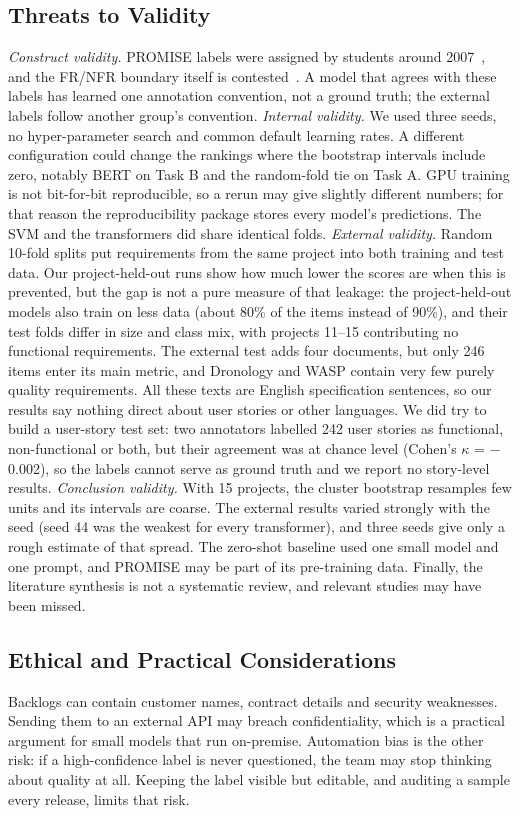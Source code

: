 \documentclass[conference,10pt,letterpaper]{IEEEtran}
\begin{document}
\subsection{Threats to Validity}\label{sec:threats}
\emph{Construct validity.} PROMISE labels were assigned by students around 2007~\cite{clelandhuang2007}, and the FR/NFR boundary itself is contested~\cite{dalpiaz2019}. A model that agrees with these labels has learned one annotation convention, not a ground truth; the external labels follow another group's convention. \emph{Internal validity.} We used three seeds, no hyper-parameter search and common default learning rates. A different configuration could change the rankings where the bootstrap intervals include zero, notably BERT on Task B and the random-fold tie on Task A. GPU training is not bit-for-bit reproducible, so a rerun may give slightly different numbers; for that reason the reproducibility package stores every model's predictions. The SVM and the transformers did share identical folds. \emph{External validity.} Random 10-fold splits put requirements from the same project into both training and test data. Our project-held-out runs show how much lower the scores are when this is prevented, but the gap is not a pure measure of that leakage: the project-held-out models also train on less data (about 80\% of the items instead of 90\%), and their test folds differ in size and class mix, with projects 11–15 contributing no functional requirements. The external test adds four documents, but only 246 items enter its main metric, and Dronology and WASP contain very few purely quality requirements. All these texts are English specification sentences, so our results say nothing direct about user stories or other languages. We did try to build a user-story test set: two annotators labelled 242 user stories as functional, non-functional or both, but their agreement was at chance level (Cohen's $\kappa$ = $-$0.002), so the labels cannot serve as ground truth and we report no story-level results. \emph{Conclusion validity.} With 15 projects, the cluster bootstrap resamples few units and its intervals are coarse. The external results varied strongly with the seed (seed 44 was the weakest for every transformer), and three seeds give only a rough estimate of that spread. The zero-shot baseline used one small model and one prompt, and PROMISE may be part of its pre-training data. Finally, the literature synthesis is not a systematic review, and relevant studies may have been missed.

\subsection{Ethical and Practical Considerations}
Backlogs can contain customer names, contract details and security weaknesses. Sending them to an external API may breach confidentiality, which is a practical argument for small models that run on-premise. Automation bias is the other risk: if a high-confidence label is never questioned, the team may stop thinking about quality at all. Keeping the label visible but editable, and auditing a sample every release, limits that risk.
\end{document}
